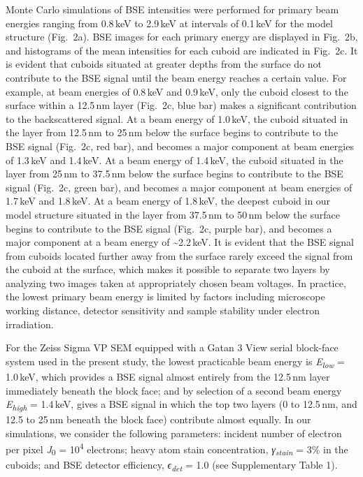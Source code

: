\documentclass{article}
\begin{document}
Monte Carlo simulations of BSE intensities were performed for primary beam energies ranging from 0.8\,keV to 2.9\,keV at intervals of 0.1\,keV for the model structure (Fig.~2a). BSE images for each primary energy are displayed in Fig.~2b, and histograms of the mean intensities for each cuboid are indicated in Fig.~2c. It is evident that cuboids situated at greater depths from the surface do not contribute to the BSE signal until the beam energy reaches a certain value. For example, at beam energies of 0.8\,keV and 0.9\,keV, only the cuboid closest to the surface within a 12.5\,nm layer (Fig.~2c, blue bar) makes a significant contribution to the backscattered signal. At a beam energy of 1.0\,keV, the cuboid situated in the layer from 12.5\,nm to 25\,nm below the surface begins to contribute to the BSE signal (Fig.~2c, red bar), and becomes a major component at beam energies of 1.3\,keV and 1.4\,keV. At a beam energy of 1.4\,keV, the cuboid situated in the layer from 25\,nm to 37.5\,nm below the surface begins to contribute to the BSE signal (Fig.~2c, green bar), and becomes a major component at beam energies of 1.7\,keV and 1.8\,keV. At a beam energy of 1.8\,keV, the deepest cuboid in our model structure situated in the layer from 37.5\,nm to 50\,nm below the surface begins to contribute to the BSE signal (Fig.~2c, purple bar), and becomes a major component at a beam energy of \textasciitilde2.2\,keV. It is evident that the BSE signal from cuboids located further away from the surface rarely exceed the signal from the cuboid at the surface, which makes it possible to separate two layers by analyzing two images taken at appropriately chosen beam voltages. In practice, the lowest primary beam energy is limited by factors including microscope working distance, detector sensitivity and sample stability under electron irradiation.

For the Zeiss Sigma VP SEM equipped with a Gatan 3 View serial block-face system used in the present study, the lowest practicable beam energy is \emph{E}\textsubscript{\emph{low}} = 1.0\,keV, which provides a BSE signal almost entirely from the 12.5\,nm layer immediately beneath the block face; and by selection of a second beam energy \emph{E}\textsubscript{\emph{high}} = 1.4\,keV, gives a BSE signal in which the top two layers (0 to 12.5\,nm, and 12.5 to 25\,nm beneath the block face) contribute almost equally. In our simulations, we consider the following parameters: incident number of electron per pixel \emph{J}\textsubscript{0} = 10\textsuperscript{4} electrons; heavy atom stain concentration, \emph{γ}\textsubscript{\emph{stain}} = 3\% in the cuboids; and BSE detector efficiency, \emph{ϵ}\textsubscript{\emph{det}} = 1.0 (see Supplementary Table 1).
\end{document}

